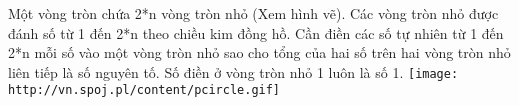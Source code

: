 Một vòng tròn chứa 2*n vòng tròn nhỏ (Xem hình vẽ). Các vòng tròn nhỏ được đánh số từ 1 đến 2*n theo chiều kim đồng hồ. Cần điền các số tự nhiên từ 1 đến 2*n mỗi số vào một vòng tròn nhỏ sao cho tổng của hai số trên hai vòng tròn nhỏ liên tiếp là số nguyên tố. Số điền ở vòng tròn nhỏ 1 luôn là số 1.  
\texttt{[image: http://vn.spoj.pl/content/pcircle.gif]}
